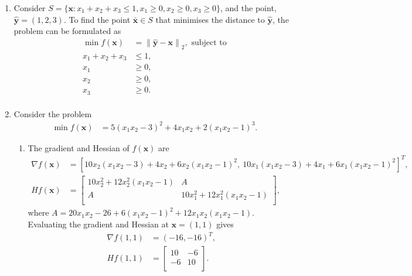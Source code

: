 \documentclass[a4paper,11pt]{article}
\newcommand{\norm}[1]{\left\lVert#1\right\rVert}
\newcommand{\ds}{\displaystyle}
\begin{document}
{{\begin{enumerate}[leftmargin=*]
		\item Consider $\ds{S = \{\mathbf{x} : x_1 + x_2 + x_3 \leq 1, x_1 \geq 0, x_2 \geq 0, x_3 \geq 0 \}}$, and the point, $\ds{\hat{\mathbf{y}} = (1,2,3)}$. To find the point $\ds{\mathbf{\bar{x}} \in S}$ that minimises the distance to $\ds{\hat{\mathbf{y}}}$, the problem can be formulated as 
			\begin{align*}
				\min f(\mathbf{x}) & = \norm{\hat{\mathbf{y}} - \mathbf{x}}_2, \text{ subject to}\\
				x_1 + x_2 + x_3 & \leq 1, \\
				x_1 & \geq 0, \\
				x_2 & \geq 0, \\
				x_3 & \geq 0. \\
			\end{align*}

		\pagebreak
		\item Consider the problem 
			\begin{align*} 
				\min f(\mathbf{x}) & = 5(x_1x_2 - 3)^2 + 4x_1x_2 + 2(x_1x_2 - 1)^3.
			\end{align*}
			\begin{enumerate}[label=\alph*)]
				\item The gradient and Hessian of $\ds{f(\mathbf{x})}$ are
					\begin{align*}
						\nabla f(\mathbf{x}) & = \left[10x_2(x_1x_2-3) + 4x_2 + 6x_2(x_1x_2-1)^2, \: 10x_1(x_1x_2-3) + 4x_1 + 6x_1(x_1x_2-1)^2\right]^T, \\
						Hf(\mathbf{x}) & = 
						\begin{bmatrix}
							10x_2^2 + 12x_2^2(x_1x_2-1) & A \\
							A & 10x_1^2 + 12x_1^2(x_1x_2-1) \\
						\end{bmatrix},
					\end{align*}
					where $\ds{A = 20x_1x_2-26+6(x_1x_2-1)^2+12x_1x_2(x_1x_2-1)}$. Evaluating the gradient and Hessian at $\ds{\mathbf{x} = (1,1)}$ gives
					\begin{align*}
						\nabla f(1,1) & = (-16, -16)^T, \\
						Hf(1,1) & = 
						\begin{bmatrix}
							10 & -6 \\
							-6 & 10 \\
						\end{bmatrix}.
					\end{align*}
					

\end{enumerate}
\end{enumerate}}}
\end{document}
